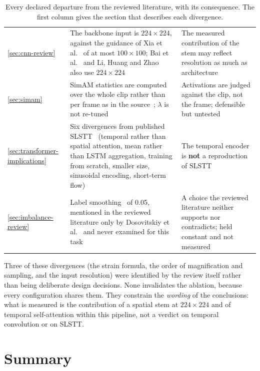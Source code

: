 \begin{table}[!htbp]
\begin{tabular}{@{}p{0.85cm} p{6.0cm} p{6.6cm}@{}}
		\ref{sec:cnn-review} & The backbone input is $224 \times 224$, against the guidance of Xia et al.~\cite{xia2020b} of at most $100 \times 100$; Bai et al.~\cite{bai2021} and Li, Huang and Zhao~\cite{liY2021} also use $224 \times 224$ & The measured contribution of the stem may reflect resolution as much as architecture \\
		\ref{sec:simam} & SimAM statistics are computed over the whole clip rather than per frame as in the source~\cite{yang2021}; $\lambda$ is not re-tuned & Activations are judged against the clip, not the frame; defensible but untested \\
		\ref{sec:transformer-implications} & Six divergences from published SLSTT~\cite{zhang2022} (temporal rather than spatial attention, mean rather than LSTM aggregation, training from scratch, smaller size, sinusoidal encoding, short-term flow) & The temporal encoder is \textbf{not} a reproduction of SLSTT \\
		\ref{sec:imbalance-review} & Label smoothing~\cite{szegedy2016} of 0.05, mentioned in the reviewed literature only by Dosovitskiy et al.~\cite{dosovitskiy2021} and never examined for this task & A choice the reviewed literature neither supports nor contradicts; held constant and not measured \\
		\hline
	\end{tabular}
	\caption[Every declared departure from the reviewed literature]{Every declared departure from the reviewed literature, with its consequence. The first column gives the section that describes each divergence.}
	\label{tab:divergence-ledger}
\end{table}

Three of these divergences (the strain formula, the order of magnification and sampling, and the input resolution) were identified by the review itself rather than being deliberate design decisions. None invalidates the ablation, because every configuration shares them. They constrain the \textit{wording} of the conclusions: what is measured is the contribution of a spatial stem at $224\times224$ and of temporal self-attention within this pipeline, not a verdict on temporal convolution or on SLSTT.


\clearpage

\section{Summary}
\label{sec:ch3-conclusion}

